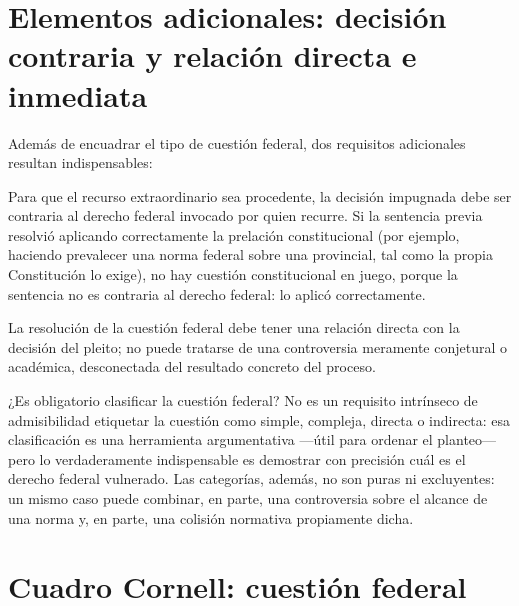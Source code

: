 \documentclass[12pt,oneside]{book}
\begin{document}
\section{Elementos adicionales: decisión contraria y relación directa e inmediata}

Además de encuadrar el tipo de cuestión federal, dos requisitos adicionales
resultan indispensables:

\begin{defbox}
Para que el recurso extraordinario sea procedente, la decisión impugnada debe ser
contraria al derecho federal invocado por quien recurre. Si la sentencia previa
resolvió aplicando correctamente la prelación constitucional (por ejemplo, haciendo
prevalecer una norma federal sobre una provincial, tal como la propia Constitución
lo exige), no hay cuestión constitucional en juego, porque la sentencia no es
contraria al derecho federal: lo aplicó correctamente.
\end{defbox}

\begin{defbox}
La resolución de la cuestión federal debe tener una relación directa con la
decisión del pleito; no puede tratarse de una controversia meramente conjetural o
académica, desconectada del resultado concreto del proceso.
\end{defbox}

\begin{impbox}
¿Es obligatorio clasificar la cuestión federal? No es un requisito intrínseco de
admisibilidad etiquetar la cuestión como simple, compleja, directa o indirecta:
esa clasificación es una herramienta argumentativa —útil para ordenar el
planteo— pero lo verdaderamente indispensable es demostrar con precisión cuál es
el derecho federal vulnerado. Las categorías, además, no son puras ni excluyentes:
un mismo caso puede combinar, en parte, una controversia sobre el alcance de una
norma y, en parte, una colisión normativa propiamente dicha.
\end{impbox}

\section{Cuadro Cornell: cuestión federal}
\end{document}
